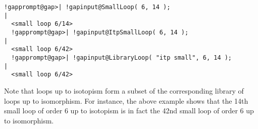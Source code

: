 \documentclass[a4paper,11pt]{report}
\begin{document}
{{{}

 
\begin{Verbatim}[commandchars=!@|,fontsize=\small,frame=single,label=Example]
  !gapprompt@gap>| !gapinput@SmallLoop( 6, 14 );
|
  <small loop 6/14>
  !gapprompt@gap>| !gapinput@ItpSmallLoop( 6, 14 );
|
  <small loop 6/42>
  !gapprompt@gap>| !gapinput@LibraryLoop( "itp small", 6, 14 );
|
  <small loop 6/42>
\end{Verbatim}
 

Note that loops up to isotopism form a subset of the corresponding library of
loops up to isomorphism. For instance, the above example shows that the 14th
small loop of order 6 up to isotopism is in fact the 42nd small loop of order
6 up to isomorphism. }

 }

 

\appendix
\end{document}
